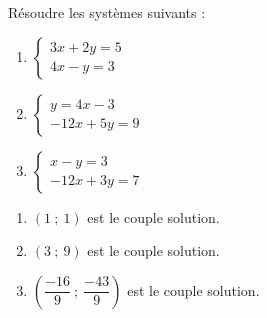 \begin{autoeval}
\begin{multicols}{2}
    \begin{exercice}
      Résoudre les systèmes suivants :
      \begin{enumerate}
      \item $\begin{cases}3x+2y=5 \\4x-y=3 \end{cases}$
      \item $\begin{cases}y=4x-3 \\-12x+5y=9 \end{cases}$
      \item $\begin{cases}x-y=3 \\-12x+3y=7 \end{cases}$
      \end{enumerate}
    \end{exercice}
    \begin{corrige}
      \begin{enumerate}
      \item $(1\ ;\ 1)$ est le couple solution.
      \item  $(3\ ;\ 9)$ est le couple solution.
      \item  $(\dfrac{-16}{9}\ ;\ \dfrac{-43}{9})$ est le couple solution.
      \end{enumerate}
    \end{corrige}
\end{multicols}
\end{autoeval}


\activites


